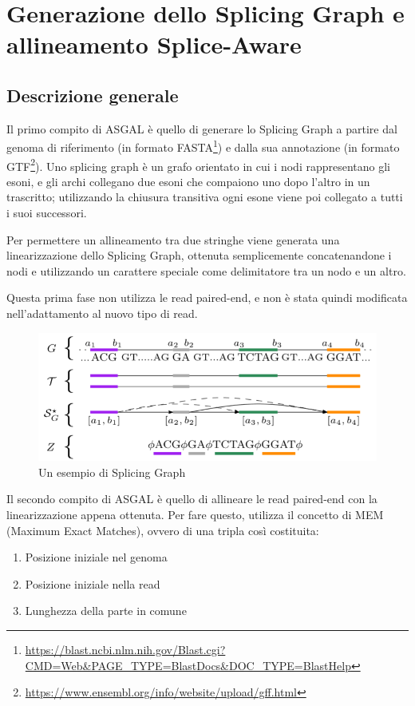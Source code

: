 \section{Generazione dello Splicing Graph e allineamento Splice-Aware}

\subsection{Descrizione generale}

Il primo compito di ASGAL è quello di generare lo Splicing Graph a partire dal genoma di riferimento (in formato FASTA\footnote{\url{https://blast.ncbi.nlm.nih.gov/Blast.cgi?CMD=Web&PAGE_TYPE=BlastDocs&DOC_TYPE=BlastHelp}}) e dalla sua annotazione (in formato GTF\footnote{\url{https://www.ensembl.org/info/website/upload/gff.html}}). Uno splicing graph è un grafo orientato in cui i nodi rappresentano gli esoni, e gli archi collegano due esoni che compaiono uno dopo l'altro in un trascritto; utilizzando la chiusura transitiva ogni esone viene poi collegato a tutti i suoi successori.

Per permettere un allineamento tra due stringhe viene generata una linearizzazione dello Splicing Graph, ottenuta semplicemente concatenandone i nodi e utilizzando un carattere speciale come delimitatore tra un nodo e un altro. 

Questa prima fase non utilizza le read paired-end, e non è stata quindi modificata nell'adattamento al nuovo tipo di read.

\begin{figure}[h!]
	\centering
	\includegraphics{images/splicinggraph.png}
  \caption{Un esempio di Splicing Graph}
  \label{fig:PairedEndReads}
\end{figure}

Il secondo compito di ASGAL è quello di allineare le read paired-end con la linearizzazione appena ottenuta. Per fare questo, utilizza il concetto di MEM (Maximum Exact Matches), ovvero di una tripla così costituita:
\begin{enumerate}
	\item Posizione iniziale nel genoma
	\item Posizione iniziale nella read
	\item Lunghezza della parte in comune
\end{enumerate}
	
